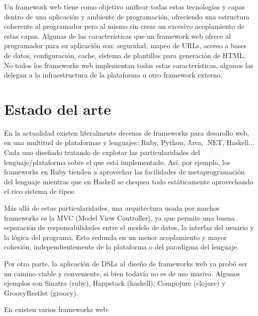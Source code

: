\documentclass[12pt]{article}
\begin{document}
Un framework web tiene como objetivo unificar todas estas tecnologías y capas dentro de una aplicación y ambiente de programación, ofreciendo una estructura coherente al programador pero al mismo sin crear un excesivo acoplamiento de estas capas. Algunas de las características que un framework web ofrece al programador para su aplicación son: seguridad, mapeo de URLs, acceso a bases de datos, configuración, cache, sistema de plantillas para generación de HTML. No todos los frameworks web implementan todas estas características, algunos las delegan a la infraestructura de la plataforma u otro framework externo.


\section{Estado del arte}

En la actualidad existen literalmente decenas de frameworks para desarollo web, en una multitud de plataformas y lenguajes: Ruby, Python, Java, .NET, Haskell... Cada uno diseñado tratando de explotar las particularidades del lenguaje/plataforma sobre el que está implementado. Así, por ejemplo, los frameworks en Ruby tienden a aprovechar las facilidades de metaprogramación del lenguaje mientras que en Haskell se chequea todo estáticamente aprovechando el rico sistema de tipos.

Más allá de estas particularidades, una arquitectura usada por muchos frameworks es la MVC (Model View Controller), ya que permite una buena separación de responsabilidades entre el modelo de datos, la interfaz del usuario y la lógica del programa. Esto redunda en un menor acoplamiento y mayor cohesión, independientemente de la plataforma o del paradigma del lenguaje.

Por otra parte, la aplicación de DSLs al diseño de frameworks web ya probó ser un camino viable y conveniente, si bien todavía no es de uso masivo. Algunos ejemplos son Sinatra \cite{sinatra} (\gls{ruby}), Happstack \cite{happstack} (\gls{haskell}), Compojure \cite{compojure} (\gls{clojure}) y GroovyRestlet \cite{groovyrestlet} (\gls{groovy}).

En  existen varios frameworks web:
\end{document}
